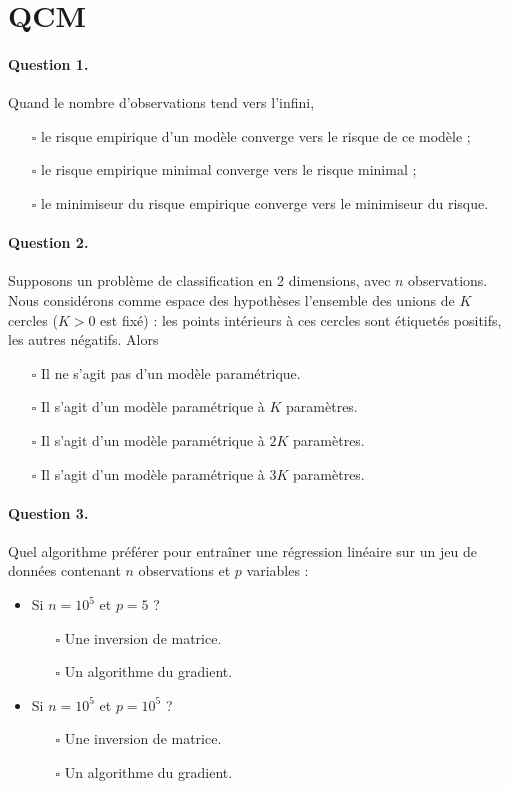 \section{QCM}
\paragraph{Question 1.} Quand le nombre d'observations tend vers l'infini, 
\begin{itemize}
\item[$\square$] le risque empirique d'un modèle converge vers le risque de ce modèle ; 
\item[$\square$] le risque empirique minimal converge vers le risque minimal ; 
\item[$\square$] le minimiseur du risque empirique converge vers le minimiseur du risque.
\end{itemize}

\paragraph{Question 2.} Supposons un problème de classification en 2
dimensions, avec $n$ observations. Nous considérons comme espace des hypothèses
l'ensemble des unions de $K$ cercles ($K > 0$ est fixé) : les points intérieurs
à ces cercles sont étiquetés positifs, les autres négatifs. Alors
\begin{itemize}
\item[$\square$] Il ne s'agit pas d'un modèle paramétrique.
\item[$\square$] Il s'agit d'un modèle paramétrique à $K$ paramètres.
\item[$\square$] Il s'agit d'un modèle paramétrique à $2K$ paramètres.
\item[$\square$] Il s'agit d'un modèle paramétrique à $3K$ paramètres.
\end{itemize}

\paragraph{Question 3.} Quel algorithme préférer pour entraîner une régression
linéaire sur un jeu de données contenant $n$ observations et $p$ variables :
\begin{itemize}
\item Si $n=10^5$ et $p=5$ ?
  \begin{itemize}
  \item[$\square$] Une inversion de matrice.
  \item[$\square$] Un algorithme du gradient.
  \end{itemize}
\item Si $n=10^5$ et $p=10^5$ ?
  \begin{itemize}
  \item[$\square$] Une inversion de matrice.
  \item[$\square$] Un algorithme du gradient.
  \end{itemize}
\end{itemize}

